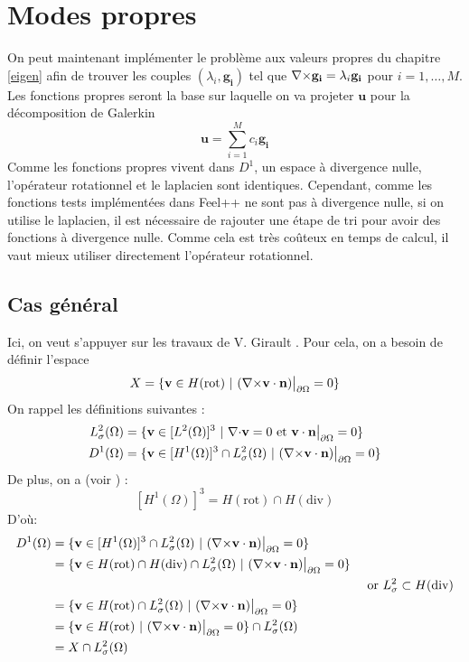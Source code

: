 \chapter{Modes propres}
On peut maintenant implémenter le problème aux valeurs propres du chapitre \ref{eigen} afin de trouver les couples $(\lambda_i,\mathbf{g_i})$ tel que ${\nabla\times}\mathbf{g_i}=\lambda_i\mathbf{g_i}$ pour $i=1,\dots,M$. Les fonctions propres seront la base sur laquelle on va projeter $\mathbf{u}$ pour la décomposition de Galerkin \[ \mathbf{u}=\sum_{i=1}^M c_i\mathbf{g_i} \]
Comme les fonctions propres vivent dans $D^1$, un espace à divergence nulle, l'opérateur rotationnel et le laplacien sont identiques. Cependant, comme les fonctions tests implémentées dans Feel++ ne sont pas à divergence nulle, si on utilise le laplacien, il est nécessaire de rajouter une étape de tri pour avoir des fonctions à divergence nulle. Comme cela est très coûteux en temps de calcul, il vaut mieux utiliser directement l'opérateur rotationnel.

\section{Cas général}
Ici, on veut s'appuyer sur les travaux de V. Girault \cite{girault90-1}. Pour cela, on a besoin de définir l'espace \[X = \{\mathbf{v}\in H(\mathrm{rot})\ |\ (\rot\mathbf{v}\cdot\mathbf{n})\restr=0 \}\]
On rappel les définitions suivantes :
\begin{align*}
L^2_\sigma(\Omega) &= \{\mathbf{v} \in [L^2(\Omega)]^3\ |\ {\nabla\cdot} \mathbf{v} = 0\text{ et }\mathbf{v}\cdot \mathbf{n}{\big\rvert_{\partial\Omega}} = 0 \}\\
D^1(\Omega) &= \{\mathbf{v} \in [H^1(\Omega)]^3\cap L^2_\sigma(\Omega)\ |\ ({\nabla\times} \mathbf{v}\cdot \mathbf{n}){\big\rvert_{\partial\Omega}} = 0  \}
\end{align*}
De plus, on a (voir \cite{Girault79}) :
\[ [H^1(\Omega)]^3=H(\mathrm{rot})\cap H(\mathrm{div}) \]
D'où:
\begin{align*}
D^1(\Omega) &= \{\mathbf{v}\in [H^1(\Omega)]^3\cap L^2_\sigma(\Omega)\ |\ ({\nabla\times} \mathbf{v}\cdot \mathbf{n}){\big\rvert_{\partial\Omega}} = 0  \}&\\
&=\{\mathbf{v}\in H(\mathrm{rot})\cap H(\mathrm{div})\cap L^2_\sigma(\Omega)\ |\ ({\nabla\times} \mathbf{v}\cdot \mathbf{n}){\big\rvert_{\partial\Omega}} = 0  \}&\\
&&\text{ or }L^2_\sigma\subset H(\mathrm{div})\\
&=\{\mathbf{v}\in H(\mathrm{rot})\cap L^2_\sigma(\Omega)\ |\ ({\nabla\times} \mathbf{v}\cdot \mathbf{n}){\big\rvert_{\partial\Omega}} = 0  \}&\\
&=\{\mathbf{v}\in H(\mathrm{rot})\ |\ ({\nabla\times} \mathbf{v}\cdot \mathbf{n}){\big\rvert_{\partial\Omega}} = 0  \}\cap L^2_\sigma(\Omega)&\\
&=X\cap L^2_\sigma(\Omega)&
\end{align*}

